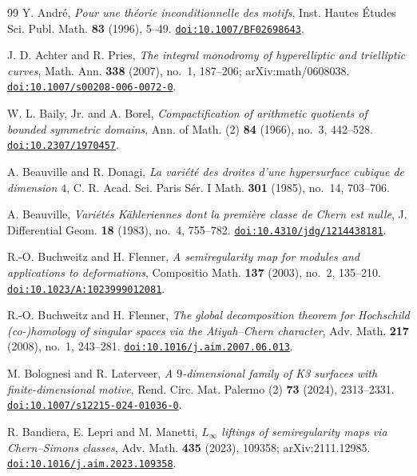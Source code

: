 \begin{thebibliography}{99}
Y. Andr\'e,
\emph{Pour une th\'eorie inconditionnelle des motifs},
Inst. Hautes \'Etudes Sci. Publ. Math. \textbf{83} (1996), 5--49.
\href{https://doi.org/10.1007/BF02698643}{\texttt{doi:10.1007/BF02698643}}.

J. D. Achter and R. Pries,
\emph{The integral monodromy of hyperelliptic and trielliptic curves},
Math. Ann. \textbf{338} (2007), no.~1, 187--206; arXiv:math/0608038.
\href{https://doi.org/10.1007/s00208-006-0072-0}{\texttt{doi:10.1007/s00208-006-0072-0}}.

W. L. Baily, Jr. and A. Borel,
\emph{Compactification of arithmetic quotients of bounded symmetric domains},
Ann. of Math. (2) \textbf{84} (1966), no.~3, 442--528.
\href{https://doi.org/10.2307/1970457}{\texttt{doi:10.2307/1970457}}.

A. Beauville and R. Donagi,
\emph{La vari\'et\'e des droites d'une hypersurface cubique de dimension
$4$},
C. R. Acad. Sci. Paris S\'er. I Math. \textbf{301} (1985), no.~14, 703--706.

A. Beauville,
\emph{Vari\'et\'es K\"ahleriennes dont la premi\`ere classe de Chern est
nulle},
J. Differential Geom. \textbf{18} (1983), no.~4, 755--782.
\href{https://doi.org/10.4310/jdg/1214438181}{\texttt{doi:10.4310/jdg/1214438181}}.

R.-O. Buchweitz and H. Flenner,
\emph{A semiregularity map for modules and applications to deformations},
Compositio Math. \textbf{137} (2003), no.~2, 135--210.
\href{https://doi.org/10.1023/A:1023999012081}{\texttt{doi:10.1023/A:1023999012081}}.

R.-O. Buchweitz and H. Flenner,
\emph{The global decomposition theorem for Hochschild (co-)homology of
singular spaces via the Atiyah--Chern character},
Adv. Math. \textbf{217} (2008), no.~1, 243--281.
\href{https://doi.org/10.1016/j.aim.2007.06.013}{\texttt{doi:10.1016/j.aim.2007.06.013}}.

M. Bolognesi and R. Laterveer,
\emph{A $9$-dimensional family of K3 surfaces with finite-dimensional motive},
Rend. Circ. Mat. Palermo (2) \textbf{73} (2024), 2313--2331.
\href{https://doi.org/10.1007/s12215-024-01036-0}{\texttt{doi:10.1007/s12215-024-01036-0}}.

R. Bandiera, E. Lepri and M. Manetti,
\emph{$L_{\infty}$ liftings of semiregularity maps via Chern--Simons classes},
Adv. Math. \textbf{435} (2023), 109358; arXiv:2111.12985.
\href{https://doi.org/10.1016/j.aim.2023.109358}{\texttt{doi:10.1016/j.aim.2023.109358}}.


\end{thebibliography}
